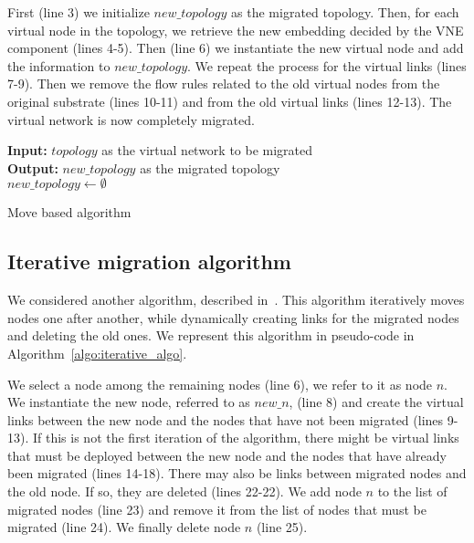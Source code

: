 First (line 3) we initialize $new\_topology$ as the migrated topology. Then, for each virtual node in the topology, we retrieve the new embedding decided by the VNE component (lines 4-5).
Then (line 6) we instantiate the new virtual node and add the information to $new\_topology$.
We repeat the process for the virtual links (lines 7-9).
Then we remove the flow rules related to the old virtual nodes from the original substrate (lines 10-11) and from the old virtual links (lines 12-13).
The virtual network is now completely migrated.




\begin{algorithm}[ht]
\textbf{Input: }$topology$ as the virtual network to be migrated\\
\textbf{Output: } $new\_topology$ as the migrated topology\\
$new\_topology \gets \emptyset$\\
\caption{Move based algorithm}
\label{algo:move_algo}
\end{algorithm}


\subsection{Iterative migration algorithm}
We considered another algorithm, described in~\cite{vnm-lo2013}.
This algorithm iteratively moves nodes one after another, while dynamically creating links for the migrated nodes and deleting the old ones.
We represent this algorithm in pseudo-code in Algorithm~\ref{algo:iterative_algo}.

We select a node among the remaining nodes (line 6), we refer to it as node $n$. We instantiate the new node, referred to as $new\_n$, (line 8) and create the virtual links between the new node and the nodes that have not been migrated (lines 9-13).
If this is not the first iteration of the algorithm, there might be virtual links that must be deployed between the new node and the nodes that have already been migrated (lines 14-18).
There may also be links between migrated nodes and the old node.
If so, they are deleted (lines 22-22).
We add node $n$ to the list of migrated nodes (line 23) and remove it from the list of nodes that must be migrated (line 24). We finally delete node $n$ (line 25).

